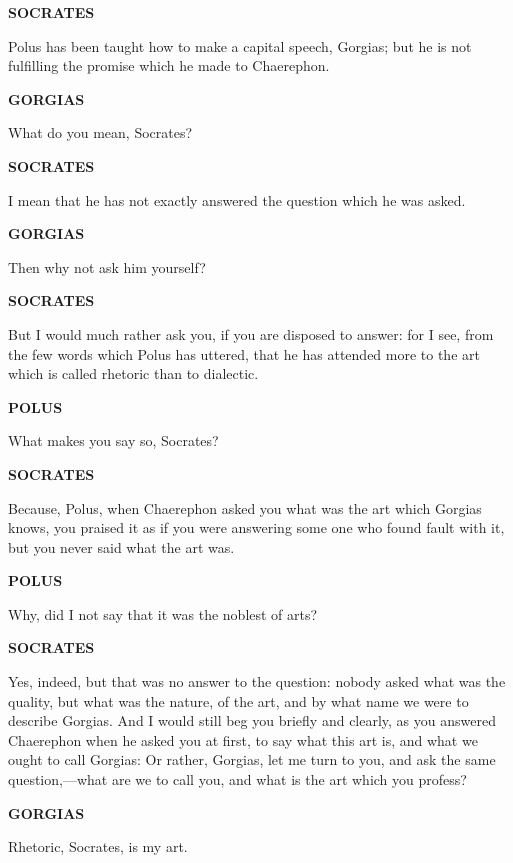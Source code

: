 \documentclass[11pt,letter]{article}
\begin{document}
\par \textbf{SOCRATES}
\par   Polus has been taught how to make a capital speech, Gorgias; but he is not fulfilling the promise which he made to Chaerephon.

\par \textbf{GORGIAS}
\par   What do you mean, Socrates?

\par \textbf{SOCRATES}
\par   I mean that he has not exactly answered the question which he was asked.

\par \textbf{GORGIAS}
\par   Then why not ask him yourself?

\par \textbf{SOCRATES}
\par   But I would much rather ask you, if you are disposed to answer:  for I see, from the few words which Polus has uttered, that he has attended more to the art which is called rhetoric than to dialectic.

\par \textbf{POLUS}
\par   What makes you say so, Socrates?

\par \textbf{SOCRATES}
\par   Because, Polus, when Chaerephon asked you what was the art which Gorgias knows, you praised it as if you were answering some one who found fault with it, but you never said what the art was.

\par \textbf{POLUS}
\par   Why, did I not say that it was the noblest of arts?

\par \textbf{SOCRATES}
\par   Yes, indeed, but that was no answer to the question:  nobody asked what was the quality, but what was the nature, of the art, and by what name we were to describe Gorgias. And I would still beg you briefly and clearly, as you answered Chaerephon when he asked you at first, to say what this art is, and what we ought to call Gorgias:  Or rather, Gorgias, let me turn to you, and ask the same question,—what are we to call you, and what is the art which you profess?

\par \textbf{GORGIAS}
\par   Rhetoric, Socrates, is my art.
\end{document}
